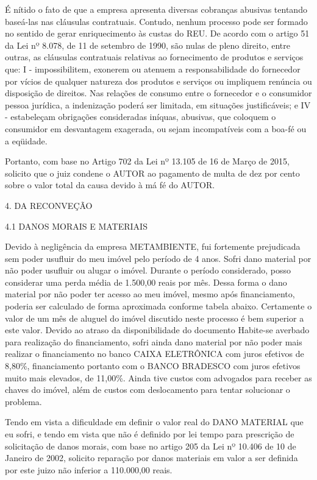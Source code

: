 \documentclass[11pt]{letter}
\begin{document}
É nítido o fato de que a empresa apresenta diversas cobranças abusivas tentando baseá-las nas cláusulas contratuais. Contudo, nenhum processo pode ser formado no sentido de gerar enriquecimento às custas do REU. De acordo com o artigo 51 da Lei nº 8.078, de 11 de setembro de 1990, são nulas de pleno direito, entre outras, as cláusulas contratuais relativas ao fornecimento de produtos e serviços que: I - impossibilitem, exonerem ou atenuem a responsabilidade do fornecedor por vícios de qualquer natureza dos produtos e serviços ou impliquem renúncia ou disposição de direitos. Nas relações de consumo entre o fornecedor e o consumidor pessoa jurídica, a indenização poderá ser limitada, em situações justificáveis; e IV - estabeleçam obrigações consideradas iníquas, abusivas, que coloquem o consumidor em desvantagem exagerada, ou sejam incompatíveis com a boa-fé ou a eqüidade.

Portanto, com base no Artigo 702 da Lei nº 13.105 de 16 de Março de 2015, solicito que o juiz condene o AUTOR ao pagamento de multa de dez por cento sobre o valor total da causa devido à má fé do AUTOR.

4. DA RECONVEÇÃO

4.1 DANOS MORAIS E MATERIAIS 
 
Devido à negligência da empresa METAMBIENTE, fui fortemente prejudicada sem poder usufluir do meu imóvel pelo período de 4 anos. Sofri dano material por não poder usufluir ou alugar o imóvel. Durante o período considerado, posso considerar uma perda média de 1.500,00 reais por mês. Dessa forma o dano material por não poder ter acesso ao meu imóvel, mesmo após financiamento, poderia ser calculado de forma aproximada conforme tabela abaixo. Certamente o valor de um mês de aluguel do imóvel discutido neste processo é bem superior a este valor. Devido ao atraso da disponibilidade do documento Habite-se averbado para realização do financiamento, sofri ainda dano material por não poder mais realizar o financiamento no banco CAIXA ELETRÔNICA com juros efetivos de 8,80\%, financiamento portanto com o BANCO BRADESCO com juros efetivos muito mais elevados, de 11,00\%. Ainda tive custos com advogados para receber as chaves do imóvel, além de custos com deslocamento para tentar solucionar o problema.

Tendo em vista a dificuldade em definir o valor real do DANO MATERIAL que eu sofri, e tendo em vista que não é definido por lei tempo para prescrição de solicitação de danos morais, com base no artigo 205 da Lei nº 10.406 de 10 de Janeiro de 2002, solicito reparação por danos materiais em valor a ser definida por este juizo não inferior a 110.000,00 reais.
\end{document}
